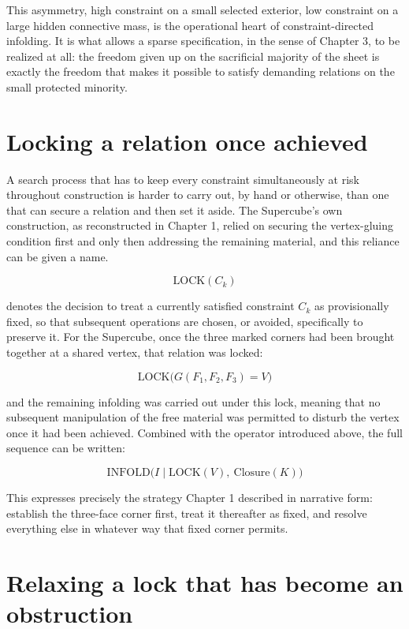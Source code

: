 \documentclass[11pt,oneside]{book}
\begin{document}
This asymmetry, high constraint on a small selected exterior, low
constraint on a large hidden connective mass, is the operational heart
of constraint-directed infolding. It is what allows a sparse
specification, in the sense of Chapter 3, to be realized at all: the
freedom given up on the sacrificial majority of the sheet is exactly the
freedom that makes it possible to satisfy demanding relations on the
small protected minority.

\hypertarget{locking-a-relation-once-achieved}{%
\section{Locking a relation once
achieved}\label{locking-a-relation-once-achieved}}

A search process that has to keep every constraint simultaneously at
risk throughout construction is harder to carry out, by hand or
otherwise, than one that can secure a relation and then set it aside.
The Supercube's own construction, as reconstructed in Chapter 1, relied
on securing the vertex-gluing condition first and only then addressing
the remaining material, and this reliance can be given a name.

\[\text{LOCK}(C_k)\]

denotes the decision to treat a currently satisfied constraint \(C_k\)
as provisionally fixed, so that subsequent operations are chosen, or
avoided, specifically to preserve it. For the Supercube, once the three
marked corners had been brought together at a shared vertex, that
relation was locked:

\[\text{LOCK}\big(G(F_1,F_2,F_3) = V\big)\]

and the remaining infolding was carried out under this lock, meaning
that no subsequent manipulation of the free material was permitted to
disturb the vertex once it had been achieved. Combined with the operator
introduced above, the full sequence can be written:

\[\text{INFOLD}\big(I \mid \text{LOCK}(V),\ \text{Closure}(K)\big)\]

This expresses precisely the strategy Chapter 1 described in narrative
form: establish the three-face corner first, treat it thereafter as
fixed, and resolve everything else in whatever way that fixed corner
permits.

\hypertarget{relaxing-a-lock-that-has-become-an-obstruction}{%
\section{Relaxing a lock that has become an
obstruction}\label{relaxing-a-lock-that-has-become-an-obstruction}}
\end{document}
